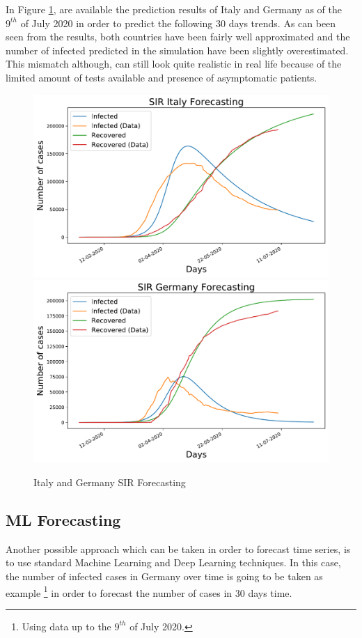 In Figure \ref{sir_forecast}, are available the prediction results of Italy and Germany as of the $9^{th}$ of July 2020 in order to predict the following 30 days trends. As can been seen from the results, both countries have been fairly well approximated and the number of infected predicted in the simulation have been slightly overestimated. This mismatch although, can still look quite realistic in real life because of the limited amount of tests available and presence of asymptomatic patients.

\begin{figure}[ht!]%
    \centering
    \includegraphics[width=0.49\linewidth]{latex/images/Italy_preds.pdf}
    \includegraphics[width=0.49\linewidth]{latex/images/Germany_preds.pdf}
    \vspace{-0.2cm}
    \caption{Italy and Germany SIR Forecasting}
    \label{sir_forecast}
\end{figure}

\subsection{ML Forecasting}

Another possible approach which can be taken in order to forecast time series, is to use standard Machine Learning and Deep Learning techniques. In this case, the number of infected cases in Germany over time is going to be taken as example \footnote{Using data up to the $9^{th}$ of July 2020.} in order to forecast the number of cases in 30 days time. 

